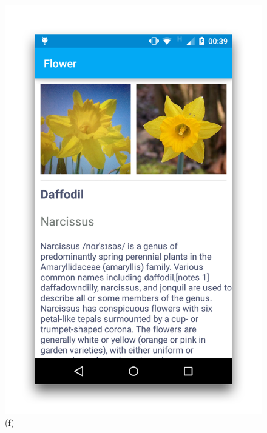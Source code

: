\documentclass[11pt, a4paper]{report}
\begin{document}
\begin{figure}[h]
\begin{minipage}[b]{0.2\linewidth}
	\includegraphics[totalheight=6cm]{img/44.png}
	(f)
\end{minipage}
\begin{minipage}[b]{0.2\linewidth}
	\centering

\end{minipage}
\end{figure}
\end{document}
